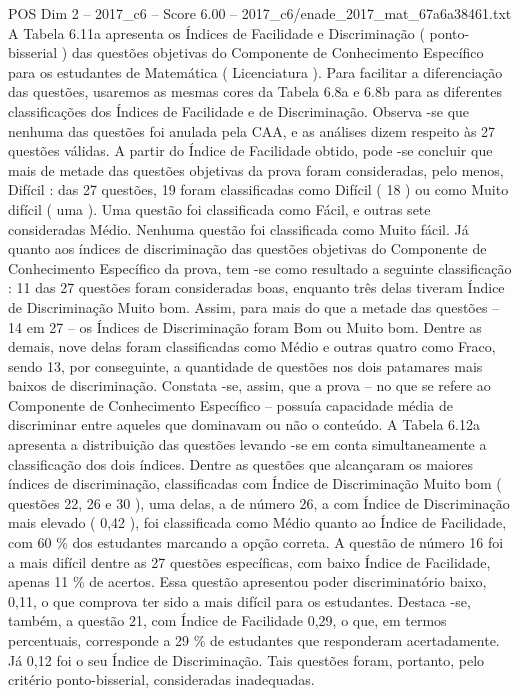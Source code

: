 \begin{textsample}{POS Dim 2 – 2017\_c6 – Score 6.00 – 2017\_c6/enade\_2017\_mat\_67a6a38461.txt}
A Tabela 6.11a apresenta os Índices de Facilidade e Discriminação ( ponto-bisserial ) das questões objetivas do Componente de Conhecimento Específico para os estudantes de Matemática ( Licenciatura ).
Para facilitar a diferenciação das questões, usaremos as mesmas cores da Tabela 6.8a e 6.8b para as diferentes classificações dos Índices de Facilidade e de Discriminação.
Observa -se que nenhuma das questões foi anulada pela CAA, e as análises dizem respeito às 27 questões válidas.
A partir do Índice de Facilidade obtido, pode -se concluir que mais de metade das questões objetivas da prova foram consideradas, pelo menos, Difícil : das 27 questões, 19 foram classificadas como Difícil ( 18 ) ou como Muito difícil ( uma ).
Uma questão foi classificada como Fácil, e outras sete consideradas Médio.
Nenhuma questão foi classificada como Muito fácil.
Já quanto aos índices de discriminação das questões objetivas do Componente de Conhecimento Específico da prova, tem -se como resultado a seguinte classificação : 11 das 27 questões foram consideradas boas, enquanto três delas tiveram Índice de Discriminação Muito bom.
Assim, para mais do que a metade das questões – 14 em 27 – os Índices de Discriminação foram Bom ou Muito bom.
Dentre as demais, nove delas foram classificadas como Médio e outras quatro como Fraco, sendo 13, por conseguinte, a quantidade de questões nos dois patamares mais baixos de discriminação.
Constata -se, assim, que a prova – no que se refere ao Componente de Conhecimento Específico – possuía capacidade média de discriminar entre aqueles que dominavam ou não o conteúdo.
A Tabela 6.12a apresenta a distribuição das questões levando -se em conta simultaneamente a classificação dos dois índices.
Dentre as questões que alcançaram os maiores índices de discriminação, classificadas com Índice de Discriminação Muito bom ( questões 22, 26 e 30 ), uma delas, a de número 26, a com Índice de Discriminação mais elevado ( 0,42 ), foi classificada como Médio quanto ao Índice de Facilidade, com 60 \% dos estudantes marcando a opção correta.
A questão de número 16 foi a mais difícil dentre as 27 questões específicas, com baixo Índice de Facilidade, apenas 11 \% de acertos.
Essa questão apresentou poder discriminatório baixo, 0,11, o que comprova ter sido a mais difícil para os estudantes.
Destaca -se, também, a questão 21, com Índice de Facilidade 0,29, o que, em termos percentuais, corresponde a 29 \% de estudantes que responderam acertadamente.
Já 0,12 foi o seu Índice de Discriminação.
Tais questões foram, portanto, pelo critério ponto-bisserial, consideradas inadequadas.

\end{textsample}
